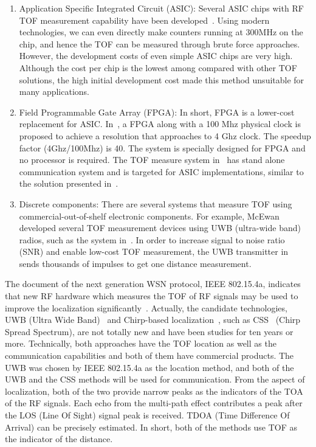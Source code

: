  \begin{enumerate}
    \item Application Specific Integrated Circuit (ASIC): Several ASIC chips with RF TOF measurement capability have been developed~\cite{CC2420DataSheet,LymberopoulosEmpiricalAna}. Using modern technologies, we can even directly make counters running at 300MHz on the chip, and hence the TOF can be measured through brute force approaches. However, the development costs of even simple ASIC chips are very high. Although the cost per chip is the lowest among compared with other TOF solutions, the high initial development cost made this method unsuitable for many applications.
    \item Field Programmable Gate Array (FPGA): In short, FPGA is a lower-cost replacement for ASIC. In~\cite{LaserRangeFinderUsingActelFPGA}, a FPGA along with a 100 Mhz physical clock is proposed to achieve a resolution that approaches to 4 Ghz clock. The speedup factor (4Ghz/100Mhz) is 40. The system is specially designed for FPGA and no processor is required. The TOF measure system in~\cite[pp79]{tufan_phd_thesis} has stand alone communication system and is targeted for ASIC implementations, similar to the solution presented in~\cite{Fontana2002}.
    \item Discrete components: There are several systems that measure TOF using commercial-out-of-shelf electronic components. For example, McEwan developed several TOF measurement devices using UWB (ultra-wide band) radios, such as the system in~\cite{McEwanShortRangeLoc}. In order to increase signal to noise ratio (SNR) and enable low-cost TOF measurement, the UWB transmitter in~\cite{McEwanShortRangeLoc} sends thousands of impulses to get one distance measurement.
\end{enumerate}

The document of the next generation WSN protocol, IEEE 802.15.4a, indicates that new RF hardware which measures the TOF of RF signals may be used to improve the localization significantly~\cite{TG4AReport}.
  Actually, the candidate technologies, UWB (Ultra Wide Band)~\cite{PahlavanIndoorGeolocation} and Chirp-based localization~\cite{AetherPatent6795491}, such as CSS~\cite{15-03-0460-00-0040-IEEE-802-CSS-Tutorial-part1} (Chirp Spread Spectrum), are not totally new and have been studies for ten years or more. Technically, both approaches have the TOF location as well as the communication capabilities and both of them have commercial products. The UWB was chosen by IEEE 802.15.4a as the location method, and both of the UWB and the CSS methods will be used for communication. %
    From the aspect of localization, both of the two provide narrow peaks as the indicators of the TOA of the RF signals. Each echo from the multi-path effect contributes a peak after the LOS (Line Of Sight) signal peak is received. TDOA (Time Difference Of Arrival) can be precisely estimated. In short, both of the methods use TOF as the indicator of the distance.

